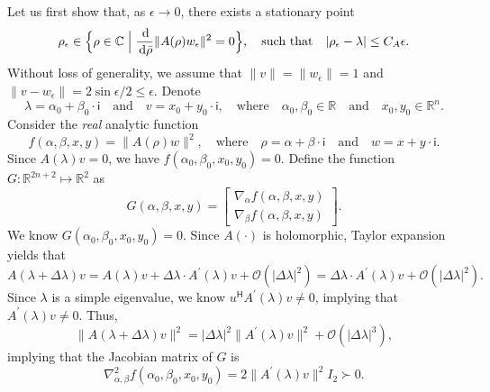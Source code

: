 \documentclass[a4paper,11pt]{article}
\newcommand{\Htran}{\mathsf{H}}
\newcommand{\de}{\,\mathrm{d}}
\newcommand{\mi}{\!\cdot\!\mathsf{i}}
\newcommand{\order}{\mathcal{O}}
\newcommand{\R}{\mathbb{R}}
\newcommand{\C}{\mathbb{C}}
\providecommand{\abs}[1]{\lvert#1\rvert}
\providecommand{\norm}[1]{\lVert#1\rVert}
\begin{document}
Let us first show that, as $\epsilon\to 0$, there exists a stationary point
\begin{equation}
    \label{eq:apprhoeps}
    \rho_{\epsilon} \in \Bigl\{ \rho\in\C \Bigm\vert \frac{\de }{\de \bar{\rho}} \norm{A(\rho)w_{\epsilon}}^{2} = 0  \Bigr\}, 
    \quad \text{such that}\quad 
    \abs{\rho_{\epsilon}-\lambda}\leq C_{A}\epsilon.
\end{equation}
Without loss of generality, we assume that $\norm{v}=\norm{w_{\epsilon}}=1$ and $\norm{v-w_{\epsilon}}=2\sin\epsilon/2\leq \epsilon$. Denote 
\begin{equation*}
    \lambda = \alpha_{0}+\beta_{0}\mi
    \quad\text{and}\quad 
    v = x_{0}+y_{0}\mi,
    \quad\text{where}\quad
    \alpha_{0},\beta_{0}\in\R
    \quad\text{and}\quad 
    x_{0},y_{0}\in\R^{n}.   
\end{equation*}
Consider the \emph{real} analytic function
\begin{equation*}
    f(\alpha,\beta,x,y) = \norm{A(\rho)w}^{2},
    \quad\text{where}\quad
    \rho=\alpha+\beta\mi 
    \quad\text{and}\quad 
    w = x+y\mi.
\end{equation*}
Since $A(\lambda)v=0$, we have $f(\alpha_{0},\beta_{0},x_{0},y_{0})=0$. Define the function $G\colon \R^{2n+2}\mapsto \R^{2}$ as 
\begin{equation*}
    G(\alpha,\beta,x,y) = \begin{bmatrix}
        \nabla_{\alpha} f(\alpha,\beta,x,y)\\ 
        \nabla_{\beta} f(\alpha,\beta,x,y)
    \end{bmatrix}.
\end{equation*}
We know $G(\alpha_{0},\beta_{0},x_{0},y_{0})=0$. Since $A(\cdot)$ is holomorphic, Taylor expansion yields that 
\begin{equation*}
    A(\lambda+\Delta \lambda) v = A(\lambda)v+\Delta \lambda\cdot A^{\prime}(\lambda) v +\order(\abs{\Delta \lambda}^{2}) = \Delta \lambda\cdot A^{\prime}(\lambda) v +\order(\abs{\Delta \lambda}^{2}).
\end{equation*}
Since $\lambda$ is a simple eigenvalue, we know $u^{\Htran}A^{\prime}(\lambda)v\neq 0$, implying that $A^{\prime}(\lambda)v\neq 0$. Thus, 
\begin{equation*}
    \norm{A(\lambda+\Delta \lambda)v}^{2} = \abs{\Delta \lambda}^{2}\norm{A^{\prime}(\lambda)v}^{2}+\order(\abs{\Delta \lambda}^{3}),
\end{equation*}
implying that the Jacobian matrix of $G$ is 
\begin{equation*}
    \nabla_{\alpha,\beta}^{2}f(\alpha_{0},\beta_{0},x_{0},y_{0}) = 2\norm{A^{\prime}(\lambda)v}^{2}I_{2}\succ 0.
\end{equation*}
\end{document}
